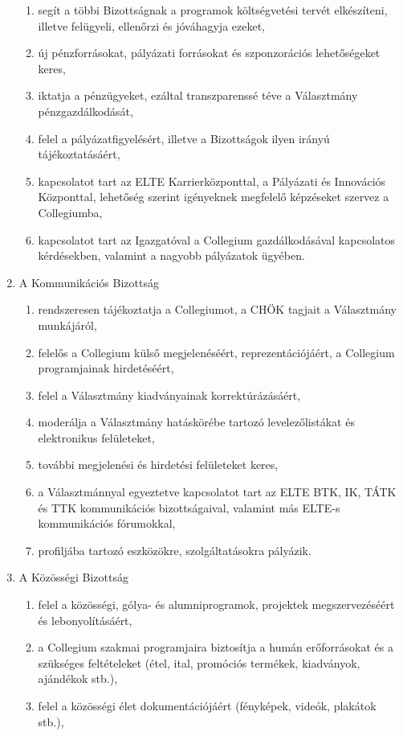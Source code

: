 \documentclass{../styles/rulebook}
\begin{document}
\begin{enumerate}
\begin{enumerate}
		\item segít a többi Bizottságnak a programok költségvetési tervét elkészíteni, illetve felügyeli, ellenőrzi és jóváhagyja ezeket,
		\item új pénzforrásokat, pályázati forrásokat és szponzorációs lehetőségeket keres,
		\item iktatja a pénzügyeket, ezáltal transzparenssé téve a Választmány pénzgazdálkodását,
		\item felel a pályázatfigyelésért, illetve a Bizottságok ilyen irányú tájékoztatásáért,
		\item kapcsolatot tart az ELTE Karrierközponttal, a Pályázati és Innovációs Központtal, lehetőség szerint igényeknek megfelelő képzéseket szervez a Collegiumba,
		\item kapcsolatot tart az Igazgatóval a Collegium gazdálkodásával kapcsolatos kérdésekben, valamint a nagyobb pályázatok ügyében.
		\end{enumerate}
	\item A Kommunikációs Bizottság
	\begin{enumerate}
		\item rendszeresen tájékoztatja a Collegiumot, a CHÖK tagjait a Választmány munkájáról,
		\item felelős a Collegium külső megjelenéséért, reprezentációjáért, a Collegium programjainak hirdetéséért,
		\item felel a Választmány kiadványainak korrektúrázásáért,
		\item moderálja a Választmány hatáskörébe tartozó levelezőlistákat és elektronikus felületeket,
		\item további megjelenési és hirdetési felületeket keres,
		\item a Választmánnyal egyeztetve kapcsolatot tart az ELTE BTK, IK, TÁTK és TTK kommunikációs bizottságaival, valamint más ELTE-s kommunikációs fórumokkal,
		\item profiljába tartozó eszközökre, szolgáltatásokra pályázik.
	\end{enumerate}
	\item A Közösségi Bizottság
	\begin{enumerate}
		\item felel a közösségi, gólya- és alumniprogramok, projektek megszervezéséért és lebonyolításáért,
		\item a Collegium szakmai programjaira biztosítja a humán erőforrásokat és a szükséges feltételeket (étel, ital, promóciós termékek, kiadványok, ajándékok stb.),
		\item felel a közösségi élet dokumentációjáért (fényképek, videók, plakátok stb.),

\end{enumerate}
\end{enumerate}
\end{document}
